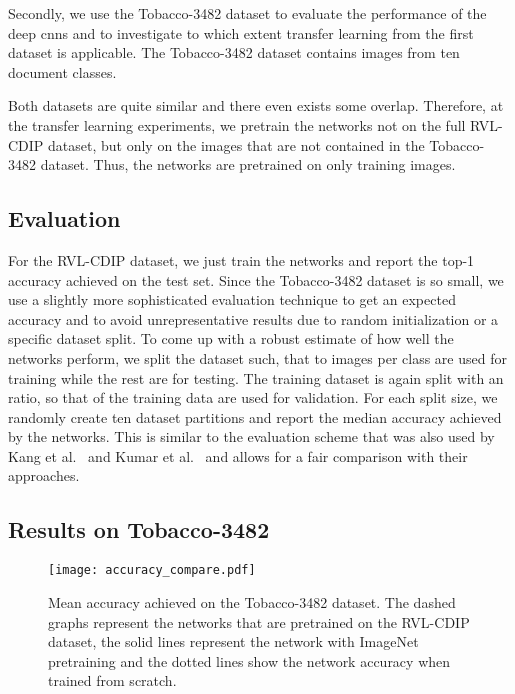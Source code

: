 \documentclass[conference]{IEEEtran}
\begin{document}
Secondly, we use the Tobacco-3482 dataset \cite{doclass_Kumar14} to evaluate the performance of the deep \ac{cnn}s and to investigate to which extent transfer learning from the first dataset is applicable. The Tobacco-3482 dataset contains  images from ten document classes. 

Both datasets are quite similar and there even exists some overlap. Therefore, at the transfer learning experiments, we pretrain the networks not on the full RVL-CDIP dataset, but only on the images that are not contained in the Tobacco-3482 dataset. Thus, the networks are pretrained on only  training images.




\subsection{Evaluation}

For the RVL-CDIP dataset, we just train the networks and report the top-1 accuracy achieved on the test set. Since the Tobacco-3482 dataset is so small, we use a slightly more sophisticated evaluation technique to get an expected accuracy and to avoid unrepresentative results due to random initialization or a specific dataset split. To come up with a robust estimate of how well the networks perform, we split the dataset such, that  to  images per class are used for training while the rest are for testing. The training dataset is again split with an  ratio, so that  of the training data are used for validation. For each split size, we randomly create ten dataset partitions and report the median accuracy achieved by the networks.
This is similar to the evaluation scheme that was also used by Kang et al.~\cite{lekang_14_a} and Kumar et al.~\cite{doclass_Kumar14} and allows for a fair comparison with their approaches.


\subsection{Results on Tobacco-3482}

\begin{figure}
        \centering
        \texttt{[image: accuracy\_compare.pdf]}
        \caption{Mean accuracy achieved on the Tobacco-3482 dataset. The dashed graphs represent the networks that are pretrained on the RVL-CDIP dataset, the solid lines represent the network with ImageNet pretraining and the dotted lines show the network accuracy when trained from scratch.}
\label{fig:accuracy}
\end{figure}
\end{document}
